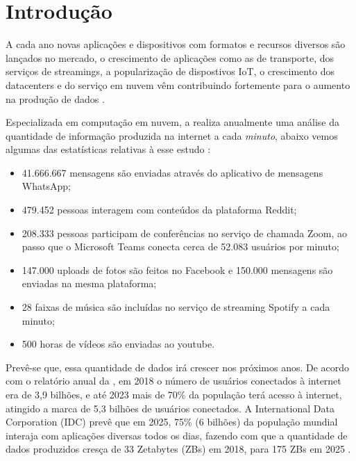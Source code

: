 \chapter{Introdução}
\label{chp:introduction}

A cada ano novas aplicações e dispositivos com formatos e recursos diversos são lançados no mercado, o crescimento de aplicações como as de transporte, dos serviços de streamings, a popularização de  dispostivos IoT, o crescimento dos datacenters e do serviço em nuvem vêm contribuindo fortemente para o aumento na produção de dados \citep{relatorio-idc}.

Especializada em computação em nuvem, a \citeauthor{domo-study} realiza anualmente uma análise da quantidade de informação produzida na internet  a cada \textit{minuto}, abaixo vemos algumas das estatísticas relativas à esse estudo \citep{domo-study}:

\begin{itemize}
    \item 41.666.667 mensagens são enviadas através do aplicativo de mensagens WhatsApp;
    \item 479.452 pessoas interagem com conteúdos da plataforma Reddit;
    \item 208.333 pessoas participam de conferências no serviço de chamada Zoom, ao passo que o Microsoft Teams conecta cerca de 52.083 usuários por minuto;
    \item 147.000 uploads de fotos são feitos no Facebook e 150.000 mensagens são enviadas na mesma plataforma;
    \item 28 faixas de música são incluídas no serviço de streaming Spotify a cada minuto;
    \item 500 horas de vídeos são enviadas ao youtube.
\end{itemize}

Prevê-se que, essa quantidade de dados irá crescer nos próximos anos. De acordo com o relatório anual da \citet{relatorio-cisco}, em 2018 o número de usuários conectados à internet era de 3,9 bilhões, e até 2023 mais de 70\% da população terá acesso à internet, atingido a marca de 5,3 bilhões de usuários conectados. A International Data Corporation (IDC) prevê que em 2025, 75\% (6 bilhões) da população mundial interaja com aplicações diversas todos os dias, fazendo com que a quantidade de dados produzidos cresça de 33 Zetabytes (ZBs) em 2018, para 175 ZBs em 2025 \citep{relatorio-idc}.%

